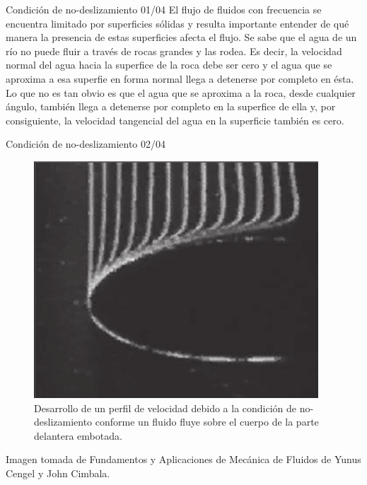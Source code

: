 

\begin{frame}{Condición de no-deslizamiento 01/04}
\justifying
El flujo de fluidos con frecuencia se encuentra limitado por superficies sólidas y resulta importante entender de qué manera la presencia de estas superficies afecta el flujo. Se sabe que el agua de un río no puede fluir a través de rocas grandes y las rodea. Es decir, la velocidad normal del agua hacia la superfice de la roca debe ser cero y el agua que se aproxima a esa superfie en forma normal llega a detenerse por completo en ésta. Lo que no es tan obvio es que el agua que se aproxima a la roca, desde cualquier ángulo, también llega a detenerse por completo en la superfice de ella y, por consiguiente, la velocidad tangencial del agua en la superficie también es cero.
\end{frame}
	
\begin{frame}{Condición de no-deslizamiento 02/04}
\justifying
\begin{figure}[H]
\centering
\includegraphics[scale=0.2]{Section_Files/imagenes/sec01_0101_Fig01-09.png}
\caption{Desarrollo de un perfil de velocidad debido a la condición de no-deslizamiento conforme un fluido fluye sobre el cuerpo de la parte delantera embotada.}
\label{fig: Figura1-09}
\end{figure}
Imagen tomada de Fundamentos y Aplicaciones de Mecánica de Fluidos de Yunus Cengel y John Cimbala.
\end{frame}


